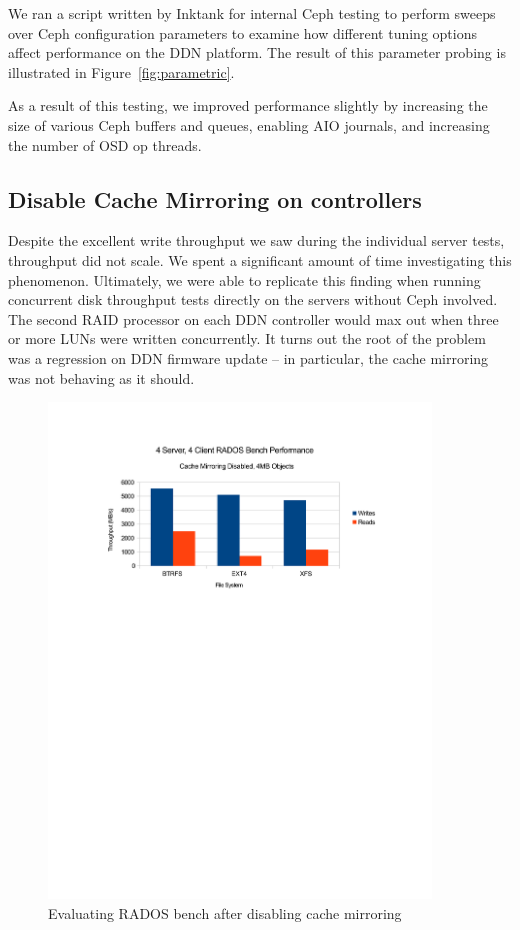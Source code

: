 \documentclass{article}
\begin{document}
We ran a script written by Inktank for internal Ceph testing to perform
sweeps over Ceph configuration parameters to examine how different
tuning options affect performance on the DDN platform. The result of this
parameter probing is illustrated in Figure~\ref{fig:parametric}.

As a result of this testing, we improved performance slightly by
increasing the size of various Ceph buffers and queues, enabling AIO journals,
and increasing the number of OSD op threads.


\subsection{Disable Cache Mirroring on controllers}


Despite the excellent write throughput we saw during the individual server
tests, throughput did not scale.  We spent a significant amount of time
investigating this phenomenon. Ultimately, we were able to replicate this finding
when running concurrent disk throughput tests directly on the servers without
Ceph involved. The second RAID processor on each DDN controller would max out when
three or more LUNs were written concurrently. It turns out the root of the problem
was a regression on DDN firmware update -- in particular, the cache
mirroring was not behaving as it should.



\begin{figure}[htb]
\centering
\includegraphics[width=4in]{rados-after-ddn}
\caption{Evaluating RADOS bench after disabling cache mirroring}
\label{fig:rados-ddn-mirror-disabled}
\end{figure}
\end{document}
